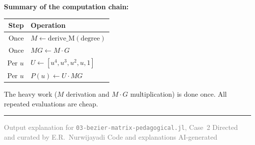 \documentclass[12pt, a4paper]{article}
\begin{document}
\begin{examplebox}
\textbf{Summary of the computation chain:}

\medskip
\begin{tabular}{rl}
\toprule
Step & Operation \\
\midrule
Once & $M \gets \text{derive\_M}(\text{degree})$ \\
Once & $MG \gets M \cdot G$ \\
Per $u$ & $U \gets [u^4, u^3, u^2, u, 1]$ \\
Per $u$ & $P(u) \gets U \cdot MG$ \\
\bottomrule
\end{tabular}

\medskip
The heavy work ($M$ derivation and $M \cdot G$ multiplication)
is done once.
All repeated evaluations are cheap.
\end{examplebox}

\vspace{2em}\hrule\vspace{0.5em}
{\small\textcolor{gray}{%
Output explanation for \texttt{03-bezier-matrix-pedagogical.jl}, Case~2
\textbar{} Directed and curated by E.R.\ Nurwijayadi
\textbar{} Code and explanations AI-generated}}
\end{document}
